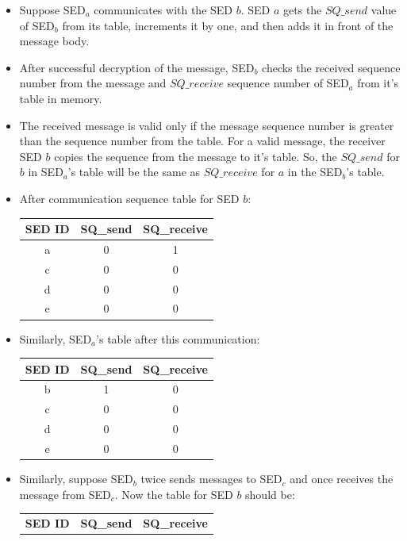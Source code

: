 \documentclass[11pt,oneside,onecolumn,letterpaper]{article}
\begin{document}
\begin{itemize}
  \item Suppose SED$_a$ communicates with the SED $b$. SED $a$ gets the 
   $SQ\_send$ value of SED$_b$ from its table, increments it by one, and then adds it in front of the message body. 
  \item After successful decryption of the message, SED$_b$ checks the received sequence number from the message and $SQ\_receive$ sequence number of SED$_a$ from it's table in memory.
  \item The received message is valid only if the message sequence number is greater than the sequence number from the table. For a valid message, the receiver SED $b$ copies the sequence from the message to it's table. So, the  $SQ\_send$ for $b$ in SED$_a$'s table will be the same as $SQ\_receive$ for $a$ in the SED$_b$'s table.
  \item After communication sequence table for SED $b$:
    \begin{center}
  \begin{tabular}{ |c|c|c| } 
   \hline
  \textbf{SED ID} & \textbf{SQ\_send} & \textbf{SQ\_receive}\\
 	\hline \hline
 	a & 0 & 1 \\ 
	c & 0 & 0 \\ 
 	d & 0 & 0 \\ 
 	e & 0 & 0 \\ 
	 \hline
\end{tabular}
\end{center}
\item Similarly, SED$_a$'s table after this communication:
    \begin{center}
  \begin{tabular}{ |c|c|c| } 
   \hline
  \textbf{SED ID} & \textbf{SQ\_send} & \textbf{SQ\_receive}\\
 	\hline \hline
 	b & 1 & 0 \\ 
	c & 0 & 0 \\ 
 	d & 0 & 0 \\ 
 	e & 0 & 0 \\ 
	 \hline
\end{tabular}
\end{center}
\item Similarly, suppose SED$_b$ twice sends messages to SED$_c$ and once receives the message from SED$_c$. Now the table for SED $b$ should be:
    \begin{center}
  \begin{tabular}{ |c|c|c| } 
   \hline
  \textbf{SED ID} & \textbf{SQ\_send} & \textbf{SQ\_receive}\\

\end{tabular}
\end{center}
\end{itemize}
\end{document}
